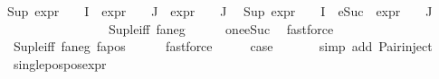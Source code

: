 \begin{isabellebody}
{\isachardoublequoteopen}{\isacharparenleft}{\kern0pt}Sup\ {\isacharparenleft}{\kern0pt}{\isacharparenleft}{\kern0pt}expr{\isacharunderscore}{\kern0pt}{}\ {\isasymcirc}\ {\isasymPhi}{\isacharparenright}{\kern0pt}\ {\isacharbackquote}{\kern0pt}\ I\ {\isasymunion}\ {\isacharparenleft}{\kern0pt}expr{\isacharunderscore}{\kern0pt}{}\ {\isasymcirc}\ {\isasymPhi}{\isacharparenright}{\kern0pt}\ {\isacharbackquote}{\kern0pt}\ J\ {\isasymunion}\ {\isacharparenleft}{\kern0pt}expr{\isacharunderscore}{\kern0pt}{}\ {\isasymcirc}\ {\isasymPhi}{\isacharparenright}{\kern0pt}\ {\isacharbackquote}{\kern0pt}\ J{\isacharparenright}{\kern0pt}{\isacharparenright}{\kern0pt}\ {\isasymle}\ {}{\isachardoublequoteclose}\isanewline
{\isachardoublequoteopen}{\isacharparenleft}{\kern0pt}Sup\ {\isacharparenleft}{\kern0pt}{\isacharparenleft}{\kern0pt}expr{\isacharunderscore}{\kern0pt}{}\ {\isasymcirc}\ {\isasymPhi}{\isacharparenright}{\kern0pt}\ {\isacharbackquote}{\kern0pt}\ I\ {\isasymunion}\ {\isacharparenleft}{\kern0pt}{\isacharparenleft}{\kern0pt}eSuc\ {\isasymcirc}\ expr{\isacharunderscore}{\kern0pt}{}\ {\isasymcirc}\ {\isasymPhi}{\isacharparenright}{\kern0pt}\ {\isacharbackquote}{\kern0pt}\ J{\isacharparenright}{\kern0pt}{\isacharparenright}{\kern0pt}{\isacharparenright}{\kern0pt}\ {\isasymle}\ {}{\isachardoublequoteclose}\isanewline
\ \ \ \ \ \ \ \ \isamarkupfalse%
\ {}\isanewline
\ \ \ \ \isamarkupfalse%
\ Sup{\isacharunderscore}{\kern0pt}le{\isacharunderscore}{\kern0pt}iff\ fa{\isacharunderscore}{\kern0pt}neg\isanewline
\ \ \ \ \isamarkupfalse%
\ one{\isacharunderscore}{\kern0pt}eSuc\ \isamarkupfalse%
\ fastforce\isanewline
\ \ \ \ \isamarkupfalse%
\ Sup{\isacharunderscore}{\kern0pt}le{\isacharunderscore}{\kern0pt}iff\ fa{\isacharunderscore}{\kern0pt}neg\ fa{\isacharunderscore}{\kern0pt}pos\isanewline
\ \ \ \ \isamarkupfalse%
\ fastforce{\isacharplus}{\kern0pt}\isanewline
\ \ \isamarkupfalse%
\ \isamarkupfalse%
\ {\isacharquery}{\kern0pt}case\ \isanewline
\ \ \ \ \isamarkupfalse%
\ {\isacharparenleft}{\kern0pt}simp\ add{\isacharcolon}{\kern0pt}\ Pair{\isacharunderscore}{\kern0pt}inject{\isacharparenright}{\kern0pt}\isanewline
{}\isamarkupfalse%
%
\endisatagproof
{\isafoldproof}%
%
\isadelimproof
\isanewline
%
\endisadelimproof
\isanewline
{}\isamarkupfalse%
\ single{\isacharunderscore}{\kern0pt}pos{\isacharunderscore}{\kern0pt}pos{\isacharunderscore}{\kern0pt}expr{\isacharcolon}{\kern0pt}\isanewline

\end{isabellebody}
